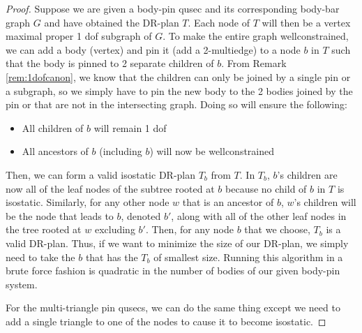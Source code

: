 \begin{proof}
    Suppose we are given a body-pin qusec and its corresponding body-bar graph $G$ and have obtained the DR-plan $T$. Each node of $T$ will then be a vertex maximal proper 1 dof subgraph of $G$. To make the entire graph wellconstrained, we can add a body (vertex) and pin it (add a 2-multiedge) to a node $b$ in $T$ such that the body is pinned to 2 separate children of $b$. From Remark \ref{rem:1dofcanon}, we know that the children can only be joined by a single pin or a subgraph, so we simply have to pin the new body to the 2 bodies joined by the pin or that are not in the intersecting graph. Doing so will ensure the following:

    \begin{itemize}
        \item All children of $b$ will remain 1 dof
        \item All ancestors of $b$ (including $b$) will now be wellconstrained
    \end{itemize}

    Then, we can form a valid isostatic DR-plan $T_b$ from $T$. In $T_b$, $b$'s children are now all of the leaf nodes of the subtree rooted at $b$ because no child of $b$ in $T$ is isostatic. Similarly, for any other node $w$ that is an ancestor of $b$, $w$'s children will be the node that leads to $b$, denoted $b'$, along with all of the other leaf nodes in the tree rooted at $w$ excluding $b'$. Then, for any node $b$ that we choose, $T_b$ is a valid DR-plan. Thus, if we want to minimize the size of our DR-plan, we simply need to take the $b$ that has the $T_b$ of smallest size. Running this algorithm in a brute force fashion is quadratic in the number of bodies of our given body-pin system.

    For the multi-triangle pin qusecs, we can do the same thing except we need to add a single triangle to one of the nodes to cause it to become isostatic.

\end{proof}



